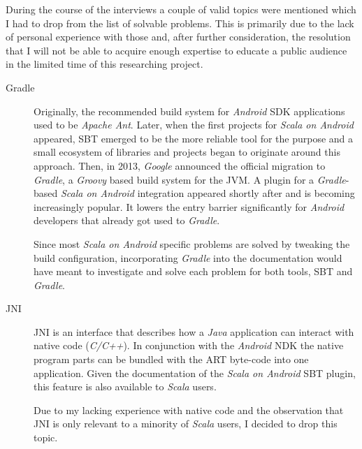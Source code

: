 During the course of the interviews a couple of valid topics were mentioned which I had to drop from the list of solvable problems. This is primarily due to the lack of personal experience with those and, after further consideration, the resolution that I will not be able to acquire enough expertise to educate a public audience in the limited time of this researching project.

\begin{description}

	\item[Gradle]\hfill

	Originally, the recommended build system for \textit{Android} \ac{SDK} applications used to be \textit{Apache Ant}. Later, when the first projects for \textit{Scala on Android} appeared, \ac{SBT} emerged to be the more reliable tool for the purpose and a small ecosystem of libraries and projects began to originate around this approach. Then, in 2013, \textit{Google} announced the official migration to \textit{Gradle}, a \textit{Groovy} based build system for the \ac{JVM}. A plugin for a \textit{Gradle}-based \textit{Scala on Android} integration appeared shortly after and is becoming increasingly popular. It lowers the entry barrier significantly for \textit{Android} developers that already got used to \textit{Gradle}.

	Since most \textit{Scala on Android} specific problems are solved by tweaking the build configuration, incorporating \textit{Gradle} into the documentation would have meant to investigate and solve each problem for both tools, \ac{SBT} and \textit{Gradle}.

	\item[JNI]\hfill

	\ac{JNI} is an interface that describes how a \textit{Java} application can interact with native code (\textit{C/C++}). In conjunction with the \textit{Android} \ac{NDK} the native program parts can be bundled with the \ac{ART} byte-code into one application. Given the documentation of the \textit{Scala on Android} \ac{SBT} plugin, this feature is also available to \textit{Scala} users.

	Due to my lacking experience with native code and the observation that \ac{JNI} is only relevant to a minority of \textit{Scala} users, I decided to drop this topic.

\end{description}